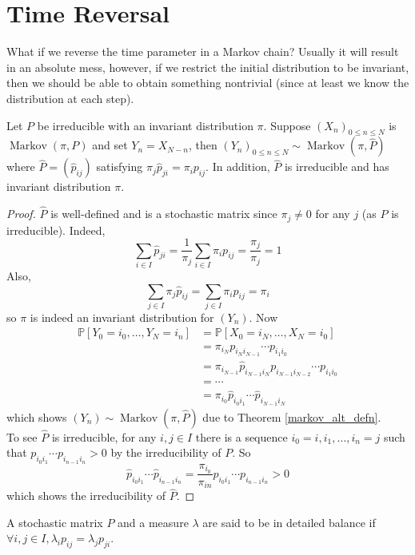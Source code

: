 \section{Time Reversal}
What if we reverse the time parameter in a Markov chain?
Usually it will result in an absolute mess, however, if we restrict the initial distribution to be invariant, then we should be able to obtain something nontrivial (since at least we know the distribution at each step).
\begin{theorem}
    Let $P$ be irreducible with an invariant distribution $\pi$.
    Suppose $(X_n)_{0\le n\le N}$ is $\operatorname{Markov}(\pi,P)$ and set $Y_n=X_{N-n}$, then $(Y_n)_{0\le n\le N}\sim\operatorname{Markov}(\pi,\hat{P})$ where $\hat{P}=(\hat{p}_{ij})$ satisfying $\pi_j\hat{p}_{ji}=\pi_ip_{ij}$.
    In addition, $\hat{P}$ is irreducible and has invariant distribution $\pi$.
\end{theorem}
\begin{proof}
    $\hat{P}$ is well-defined and is a stochastic matrix since $\pi_j\neq 0$ for any $j$ (as $P$ is irreducible).
    Indeed,
    $$\sum_{i\in I}\hat{p}_{ji}=\frac{1}{\pi_j}\sum_{i\in I}\pi_ip_{ij}=\frac{\pi_j}{\pi_j}=1$$
    Also,
    $$\sum_{j\in I}\pi_j\hat{p}_{ij}=\sum_{j\in I}\pi_ip_{ij}=\pi_i$$
    so $\pi$ is indeed an invariant distribution for $(Y_n)$.
    Now
    \begin{align*}
        \mathbb P[Y_0=i_0,\ldots,Y_N=i_n]&=\mathbb P[X_0=i_N,\ldots,X_N=i_0]\\
        &=\pi_{i_N}p_{i_Ni_{N-1}}\cdots p_{i_1i_0}\\
        &=\pi_{i_{N-1}}\hat{p}_{i_{N-1}i_N}p_{i_{N-1}i_{N-2}}\cdots p_{i_1i_0}\\
        &=\cdots\\
        &=\pi_{i_0}\hat{p}_{i_0i_1}\cdots\hat{p}_{i_{N-1}i_N}
    \end{align*}
    which shows $(Y_n)\sim\operatorname{Markov}(\pi,\hat{P})$ due to Theorem \ref{markov_alt_defn}.\\
    To see $\hat{P}$ is irreducible, for any $i,j\in I$ there is a sequence $i_0=i,i_1,\ldots,i_n=j$ such that $p_{i_0i_1}\cdots p_{i_{n-1}i_n}>0$ by the irreducibility of $P$.
    So
    $$\hat{p}_{i_0i_1}\cdots \hat{p}_{i_{n-1}i_n}=\frac{\pi_{i_0}}{\pi_{in}}p_{i_0i_1}\cdots p_{i_{n-1}i_n}>0$$
    which shows the irreducibility of $\hat{P}$.
\end{proof}
\begin{definition}
    A stochastic matrix $P$ and a measure $\lambda$ are said to be in detailed balance if $\forall i,j\in I,\lambda_ip_{ij}=\lambda_jp_{ji}$.
\end{definition}
